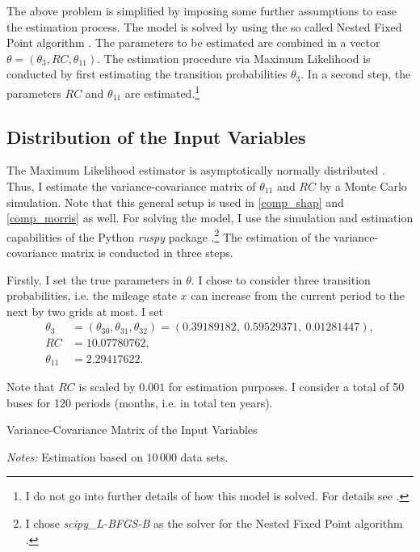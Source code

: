 The above problem is simplified by imposing some further assumptions to ease the estimation process. The model is solved by using the so called Nested Fixed Point algorithm \citep{R87}. The parameters to be estimated are combined in a vector $\theta=(\theta_3, RC, \theta_{11}) $. The estimation procedure via Maximum Likelihood is conducted by first estimating the transition probabilities $\theta_3$. In a second step, the parameters $RC$ and $\theta_{11}$ are estimated.\footnote{I do not go into further details of how this model is solved. For details see \citet{R87}.}

\subsection{Distribution of the Input Variables} \label{model_setup}

The Maximum Likelihood estimator is asymptotically normally distributed \citep{R73}. Thus, I estimate the variance-covariance matrix of $\theta_{11}$ and $RC$ by a Monte Carlo simulation. Note that this general setup is used in \cref{comp_shap} and \cref{comp_morris} as well. For solving the model, I use the simulation and estimation capabilities of the Python \textit{ruspy} package \citep{OSE19}.\footnote{I chose \textit{scipy\_L-BFGS-B} as the solver for the Nested Fixed Point algorithm \citep{SP20}.} The estimation of the variance-covariance matrix is conducted in three steps.

Firstly, I set the true parameters in $\theta$. I chose to consider three transition probabilities, i.e. the mileage state $x$ can increase from the current period to the next by two grids at most. I set
\begin{align*}
\theta_3 &= (\theta_{30}, \theta_{31}, \theta_{32})=(0.39189182,\ 0.59529371,\ 0.01281447),\\
RC &= 10.07780762,\\
\theta_{11} &= 2.29417622.
\end{align*}

\noindent Note that $RC$ is scaled by $0.001$ for estimation purposes. I consider a total of 50 buses for 120 periods (months, i.e. in total ten years).

\begin{table}
	\centering
	\caption{Variance-Covariance Matrix of the Input Variables}
	\label{cov}
	\begin{threeparttable}
	\centering
	
	\begin{tablenotes}
	\small
	\item \textit{Notes:} Estimation based on $10\,000$ data sets.
	\end{tablenotes}
	\end{threeparttable}
\end{table}

